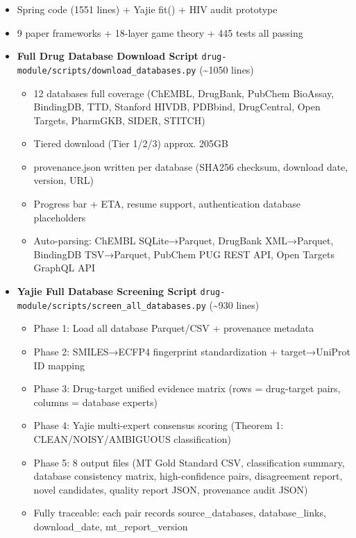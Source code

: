\documentclass[
  12pt,
]{article}
\providecommand{\tightlist}{%
  \setlength{\itemsep}{0pt}\setlength{\parskip}{0pt}}
\begin{document}
\begin{itemize}
\tightlist
\item[$\boxtimes$]
  Spring code (1551 lines) + Yajie fit() + HIV audit prototype
\item[$\boxtimes$]
  9 paper frameworks + 18-layer game theory + 445 tests all passing
\item[$\boxtimes$]
  \textbf{Full Drug Database Download Script} \texttt{drug-module/scripts/download\_databases.py} (\textasciitilde1050 lines)

  \begin{itemize}
  \tightlist
  \item
    12 databases full coverage (ChEMBL, DrugBank, PubChem BioAssay, BindingDB, TTD, Stanford HIVDB, PDBbind, DrugCentral, Open Targets, PharmGKB, SIDER, STITCH)
  \item
    Tiered download (Tier 1/2/3) approx. 205GB
  \item
    provenance.json written per database (SHA256 checksum, download date, version, URL)
  \item
    Progress bar + ETA, resume support, authentication database placeholders
  \item
    Auto-parsing: ChEMBL SQLite→Parquet, DrugBank XML→Parquet, BindingDB TSV→Parquet, PubChem PUG REST API, Open Targets GraphQL API
  \end{itemize}
\item[$\boxtimes$]
  \textbf{Yajie Full Database Screening Script} \texttt{drug-module/scripts/screen\_all\_databases.py} (\textasciitilde930 lines)

  \begin{itemize}
  \tightlist
  \item
    Phase 1: Load all database Parquet/CSV + provenance metadata
  \item
    Phase 2: SMILES→ECFP4 fingerprint standardization + target→UniProt ID mapping
  \item
    Phase 3: Drug-target unified evidence matrix (rows = drug-target pairs, columns = database experts)
  \item
    Phase 4: Yajie multi-expert consensus scoring (Theorem 1: CLEAN/NOISY/AMBIGUOUS classification)
  \item
    Phase 5: 8 output files (MT Gold Standard CSV, classification summary, database consistency matrix, high-confidence pairs, disagreement report, novel candidates, quality report JSON, provenance audit JSON)
  \item
    Fully traceable: each pair records source\_databases, database\_links, download\_date, mt\_report\_version
  \end{itemize}
\end{itemize}
\end{document}
